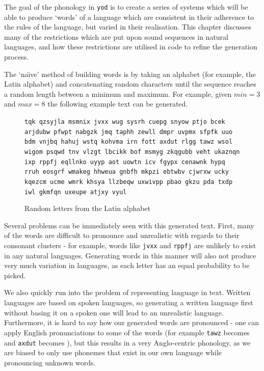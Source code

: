 \documentclass{report}
\begin{document}
   The goal of the phonology in \texttt{yod} is to create a series of systems which will be able to produce `words' of a language which are consistent in their adherence to the rules of the language, but varied in their realisation. This chapter discusses many of the restrictions which are put upon sound sequences in natural languages, and how these restrictions are utilised in code to refine the generation process.
   
   The `na\"{\i}ve' method of building words is by taking an alphabet (for example, the Latin alphabet) and concatenating random characters until the sequence reaches a random length between a minimum and maximum. For example, given $min = 3$ and $max = 8$ the following example text can be generated.
   
   \begin{figure}[h]
   \caption{Random letters from the Latin alphabet}
   \label{random letters from latin alphabet}  
   \begin{tcolorbox}
\texttt{tqk qzsyjla msmnix jvxx wug sysrh cuepg snyow ptjo bcek arjdubw pfwpt nabgzk jmq taphh zewll dmpr uvpmx sfpfk uuo bdm vnjbq hahuj wstq kohvma irn fott axdut rlgg tawz wsol wigom psqwd tnv vlzgt lbcikk bof msmyg zkqgubb veht ukaznqn ixp rppfj eqllnko uyyp aot uowtn icv fgypx cenawnk hypq rruh eosgrf wmakeg hhweua gnbfh mkpzi ebtwbv cjwrxw ucky kqezcm ucme wmrk khsya llzbeqw uxwivpp pbao gkzu pda txdp iwl gkmfqn uxeupe atjxy vyul}
   \end{tcolorbox}
\end{figure}
   
   Several problems can be immediately seen with this generated text. First, many of the words are difficult to pronounce and unrealistic with regards to their consonant clusters - for example, words like \verb|jvxx| and \verb|rppfj| are unlikely to exist in any natural languages. Generating words in this manner will also not produce very much variation in languages, as each letter has an equal probability to be picked.
   
   We also quickly run into the problem of representing language in text. Written languages are based on spoken languages, so generating a written language first without basing it on a spoken one will lead to an unrealistic language. Furthermore, it is hard to say how our generated words are pronounced - one can apply English pronunciations to some of the words (for example \verb|tawz| becomes  and \verb|axdut| becomes ), but this results in a very Anglo-centric phonology, as we are biased to only use phonemes that exist in our own language while pronouncing unknown words.
   
\end{document}
